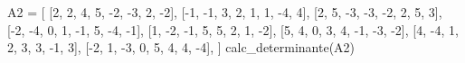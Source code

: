 \documentclass[
  letterpaper,
  DIV=11,
  numbers=noendperiod]{scrartcl}
\newenvironment{Shaded}{\begin{snugshade}}{\end{snugshade}}
\newcommand{\DecValTok}[1]{\textcolor[rgb]{0.68,0.00,0.00}{#1}}
\newcommand{\NormalTok}[1]{\textcolor[rgb]{0.00,0.23,0.31}{#1}}
\newcommand{\OperatorTok}[1]{\textcolor[rgb]{0.37,0.37,0.37}{#1}}
\begin{document}
\begin{Shaded}
\begin{Highlighting}[]
\NormalTok{A2 }\OperatorTok{=}\NormalTok{ [}
\NormalTok{    [}\DecValTok{2}\NormalTok{, }\DecValTok{2}\NormalTok{, }\DecValTok{4}\NormalTok{, }\DecValTok{5}\NormalTok{, }\OperatorTok{{-}}\DecValTok{2}\NormalTok{, }\OperatorTok{{-}}\DecValTok{3}\NormalTok{, }\DecValTok{2}\NormalTok{, }\OperatorTok{{-}}\DecValTok{2}\NormalTok{],}
\NormalTok{    [}\OperatorTok{{-}}\DecValTok{1}\NormalTok{, }\OperatorTok{{-}}\DecValTok{1}\NormalTok{, }\DecValTok{3}\NormalTok{, }\DecValTok{2}\NormalTok{, }\DecValTok{1}\NormalTok{, }\DecValTok{1}\NormalTok{, }\OperatorTok{{-}}\DecValTok{4}\NormalTok{, }\DecValTok{4}\NormalTok{],}
\NormalTok{    [}\DecValTok{2}\NormalTok{, }\DecValTok{5}\NormalTok{, }\OperatorTok{{-}}\DecValTok{3}\NormalTok{, }\OperatorTok{{-}}\DecValTok{3}\NormalTok{, }\OperatorTok{{-}}\DecValTok{2}\NormalTok{, }\DecValTok{2}\NormalTok{, }\DecValTok{5}\NormalTok{, }\DecValTok{3}\NormalTok{],}
\NormalTok{    [}\OperatorTok{{-}}\DecValTok{2}\NormalTok{, }\OperatorTok{{-}}\DecValTok{4}\NormalTok{, }\DecValTok{0}\NormalTok{, }\DecValTok{1}\NormalTok{, }\OperatorTok{{-}}\DecValTok{1}\NormalTok{, }\DecValTok{5}\NormalTok{, }\OperatorTok{{-}}\DecValTok{4}\NormalTok{, }\OperatorTok{{-}}\DecValTok{1}\NormalTok{],}
\NormalTok{    [}\DecValTok{1}\NormalTok{, }\OperatorTok{{-}}\DecValTok{2}\NormalTok{, }\OperatorTok{{-}}\DecValTok{1}\NormalTok{, }\DecValTok{5}\NormalTok{, }\DecValTok{5}\NormalTok{, }\DecValTok{2}\NormalTok{, }\DecValTok{1}\NormalTok{, }\OperatorTok{{-}}\DecValTok{2}\NormalTok{],}
\NormalTok{    [}\DecValTok{5}\NormalTok{, }\DecValTok{4}\NormalTok{, }\DecValTok{0}\NormalTok{, }\DecValTok{3}\NormalTok{, }\DecValTok{4}\NormalTok{, }\OperatorTok{{-}}\DecValTok{1}\NormalTok{, }\OperatorTok{{-}}\DecValTok{3}\NormalTok{, }\OperatorTok{{-}}\DecValTok{2}\NormalTok{],}
\NormalTok{    [}\DecValTok{4}\NormalTok{, }\OperatorTok{{-}}\DecValTok{4}\NormalTok{, }\DecValTok{1}\NormalTok{, }\DecValTok{2}\NormalTok{, }\DecValTok{3}\NormalTok{, }\DecValTok{3}\NormalTok{, }\OperatorTok{{-}}\DecValTok{1}\NormalTok{, }\DecValTok{3}\NormalTok{],}
\NormalTok{    [}\OperatorTok{{-}}\DecValTok{2}\NormalTok{, }\DecValTok{1}\NormalTok{, }\OperatorTok{{-}}\DecValTok{3}\NormalTok{, }\DecValTok{0}\NormalTok{, }\DecValTok{5}\NormalTok{, }\DecValTok{4}\NormalTok{, }\DecValTok{4}\NormalTok{, }\OperatorTok{{-}}\DecValTok{4}\NormalTok{],}
\NormalTok{]}
\NormalTok{calc\_determinante(A2)}
\end{Highlighting}
\end{Shaded}
\end{document}
